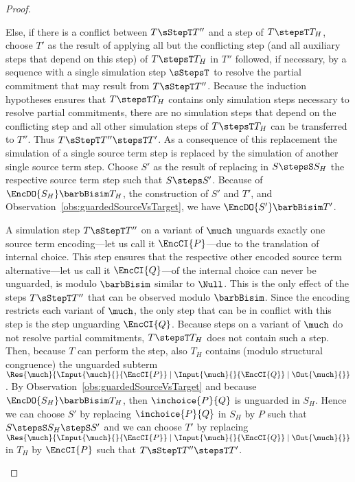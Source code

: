 \documentclass[]{eptcs}
\begin{document}
\begin{proof}
\begin{compactitem}
\begin{compactenum}
					Else, if there is a conflict between $ T \sStepT T'' $ and a step of $ T \stepsT T_H $, choose $ T' $ as the result of applying all but the conflicting step (and all auxiliary steps that depend on this step) of $ T \stepsT T_H $ in $ T'' $ followed, if necessary, by a sequence with a single simulation step $ \sStepsT $ to resolve the partial commitment that may result from $ T \sStepT T'' $. Because the induction hypotheses ensures that $ T \stepsT T_H $ contains only simulation steps necessary to resolve partial commitments, there are no simulation steps that depend on the conflicting step and all other simulation steps of $ T \stepsT T_H $ can be transferred to $ T'' $. Thus $ T \sStepT T'' \stepsT T' $. As a consequence of this replacement the simulation of a single source term step is replaced by the simulation of another single source term step. Choose $ S' $ as the result of replacing in $ S \stepsS S_H $ the respective source term step such that $ S \steps S' $. Because of $ \EncDO{S_H} \barbBisim T_H $, the construction of $ S' $ and $ T' $, and Observation~\ref{obs:guardedSourceVsTarget}, we have $ \EncDO{S'} \barbBisim T' $.
				\item A simulation step $ T \sStepT T'' $ on a variant of $ \much $ unguards exactly one source term encoding---let us call it $ \EncCI{P} $---due to the translation of internal choice. This step ensures that the respective other encoded source term alternative---let us call it $ \EncCI{Q} $---of the internal choice can never be unguarded, \ie is modulo $ \barbBisim $ similar to $ \Null $. This is the only effect of the steps $ T \sStepT T'' $ that can be observed modulo $ \barbBisim $.
					Since the encoding restricts each variant of $ \much $, the only step that can be in conflict with this step is the step unguarding $ \EncCI{Q} $. Because steps on a variant of $ \much $ do not resolve partial commitments, $ T \stepsT T_H $ does not contain such a step. Then, because $ T $ can perform the step, also $ T_H $ contains (modulo structural congruence) the unguarded subterm $ \Res{\much}{\Input{\much}{}{\EncCI{P}} \mid \Input{\much}{}{\EncCI{Q}} \mid \Out{\much}{}} $. By Observation~\ref{obs:guardedSourceVsTarget} and because $ \EncDO{S_H} \barbBisim T_H $, then $ \inchoice{P}{Q} $ is unguarded in $ S_H $.
					Hence we can choose $ S' $ by replacing $ \inchoice{P}{Q} $ in $ S_H $ by $ P $ such that $ S \stepsS S_H \stepS S' $ and we can choose $ T' $ by replacing $ \Res{\much}{\Input{\much}{}{\EncCI{P}} \mid \Input{\much}{}{\EncCI{Q}} \mid \Out{\much}{}} $ in $ T_H $ by $ \EncCI{P} $ such that $ T \sStepT T'' \stepsT T' $.

\end{compactenum}
\end{compactitem}
\end{proof}
\end{document}
